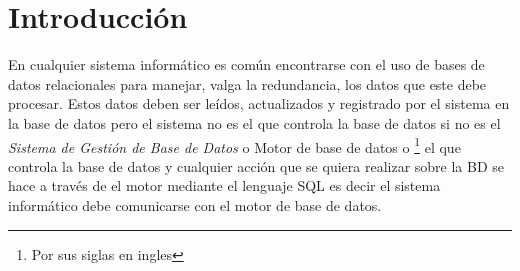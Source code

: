 \chapter{Introducción}
En cualquier sistema informático es común encontrarse con el uso de bases de datos relacionales para manejar, valga la redundancia, los datos que este debe procesar. Estos datos deben ser leídos, actualizados y registrado por el sistema en la base de datos pero el sistema no es el que controla la base de datos si no es el \textit{Sistema de Gestión de Base de Datos} o Motor de base de datos o \dd\footnote{Por sus siglas en ingles} el que controla la base de datos y cualquier acción que se quiera realizar sobre la BD se hace a través de el motor mediante el lenguaje SQL es decir el sistema informático debe comunicarse con el motor de base de datos. 

